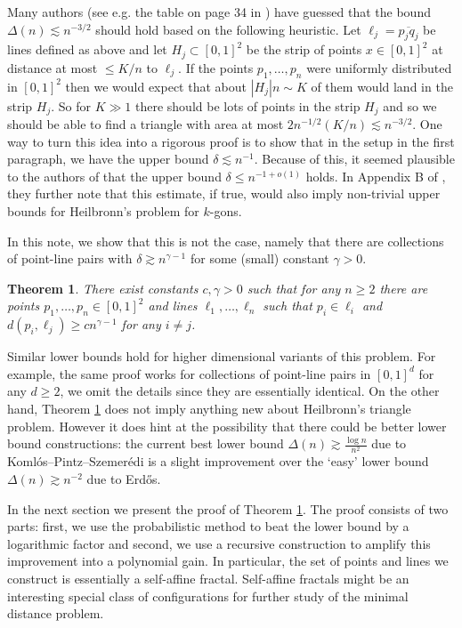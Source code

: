 \documentclass[11pt,letterpaper]{amsart}
\newtheorem{theorem}{Theorem}[section]
\renewcommand{\le}{\leqslant}
\renewcommand{\ge}{\geqslant}
\def\d{\delta}
\begin{document}
Many authors (see e.g. the table on page 34 in \cite{cohen2023new}) have guessed that the bound $\Delta(n) \lesssim n^{-3/2}$ should hold based on the following heuristic.
Let $\ell_j = \overline{p_j q_j}$ be lines defined as above and let $H_j \subset [0,1]^2$ be the strip of points $x\in [0,1]^2$ at distance at most $\le K/n$ to $\ell_j$. If the points $p_1, \ldots, p_n$ were uniformly distributed in $[0,1]^2$ then we would expect that about $|H_j|n \sim K$ of them would land in the strip $H_j$. So for $K\gg 1$ there should be lots of points in the strip $H_j$ and so we should be able to find a triangle with area at most $2n^{-1/2} (K/n) \lesssim n^{-3/2}$. One way to turn this idea into a rigorous proof is to show that in the setup in the first paragraph, we have the upper bound $\d \lesssim n^{-1}$. Because of this, it seemed plausible to the authors of \cite{cohen2025lower} that the upper bound $\d\le n^{-1+o(1)}$ holds. In Appendix B of \cite{cohen2025lower}, they further note that this estimate, if true, would also imply non-trivial upper bounds for Heilbronn's problem for $k$-gons. 

In this note, we show that this is not the case, namely that there are collections of point-line pairs with $\d \gtrsim n^{\gamma -1}$ for some (small) constant $\gamma>0$. 

\begin{theorem}\label{thm:main}
    There exist constants $c,\gamma>0$ such that for any $n\ge 2$ there are points $p_1, \ldots, p_n \in [0,1]^2$ and lines $\ell_1, \ldots, \ell_n$ such that $p_i\in \ell_i$ and $d(p_i, \ell_j) \ge c n^{\gamma-1}$ for any $i\neq j$. 
\end{theorem}

Similar lower bounds hold for higher dimensional variants of this problem. For example, the same proof works for collections of point-line pairs in $[0,1]^d$ for any $d\ge 2$, we omit the details since they are essentially identical. On the other hand, Theorem \ref{thm:main} does not imply anything new about Heilbronn's triangle problem. However it does hint at the possibility that there could be better lower bound constructions: the current best lower bound $\Delta(n) \gtrsim \frac{\log n}{n^2}$ due to Koml\'os--Pintz--Szemer\'edi \cite{komlos1982lower} is a slight improvement over the `easy' lower bound $\Delta(n) \gtrsim n^{-2}$ due to Erd\H os.

In the next section we present the proof of Theorem \ref{thm:main}. The proof consists of two parts: first, we use the probabilistic method to beat the lower bound by a logarithmic factor and second, we use a recursive construction to amplify this improvement into a polynomial gain. In particular, the set of points and lines we construct is essentially a self-affine fractal. Self-affine fractals might be an interesting special class of configurations for further study of the minimal distance problem.
\end{document}
